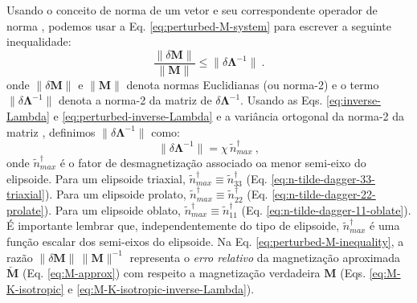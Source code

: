 Usando o conceito de norma de um vetor e seu correspondente operador de norma \citep{demmel1997, golub2013}, podemos usar a Eq.
\ref{eq:perturbed-M-system} para escrever a seguinte inequalidade:
\begin{equation}
\frac{\| \delta \mathbf{M} \|}{\| \mathbf{M} \|} \leq
\| \delta \mathbf{\Lambda}^{-1} \| \: .
\label{eq:perturbed-M-inequality}
\end{equation}
onde $\| \delta \mathbf{M} \|$ e $\| \mathbf{M} \|$
denota normas Euclidianas (ou norma-2) e o termo 
$\| \delta \mathbf{\Lambda}^{-1} \|$ denota a norma-2 da matriz
de $\delta \mathbf{\Lambda}^{-1}$.
Usando as Eqs. \ref{eq:inverse-Lambda} e \ref{eq:perturbed-inverse-Lambda}
e a variância ortogonal da norma-2 da matriz
\citep{demmel1997, golub2013}, definimos
$\| \delta \mathbf{\Lambda}^{-1} \|$ como:
\begin{equation}
\| \delta \mathbf{\Lambda}^{-1} \| = \chi \,
\tilde{n}^{\dagger}_{max} \: ,
\label{eq:norm-perturbed-inverse-Lambda}
\end{equation}
onde $\tilde{n}^{\dagger}_{max}$ é o fator de desmagnetização
associado oa menor semi-eixo do elipsoide.
Para um elipsoide triaxial, 
$\tilde{n}^{\dagger}_{max} \equiv \tilde{n}^{\dagger}_{33}$
(Eq. \ref{eq:n-tilde-dagger-33-triaxial}). Para um elipsoide prolato,
$\tilde{n}^{\dagger}_{max} \equiv \tilde{n}^{\dagger}_{22}$
(Eq. \ref{eq:n-tilde-dagger-22-prolate}). 
Para um elipsoide oblato,
$\tilde{n}^{\dagger}_{max} \equiv \tilde{n}^{\dagger}_{11}$
(Eq. \ref{eq:n-tilde-dagger-11-oblate}).
É importante lembrar que, independentemente do tipo de elipsoide, $\tilde{n}^{\dagger}_{max}$ é
uma função escalar dos semi-eixos do elipsoide.
Na Eq. \ref{eq:perturbed-M-inequality}, a razão
$\| \delta \mathbf{M} \| \, \| \mathbf{M} \|^{-1}$ representa o
\textit{erro relativo} da magnetização aproximada
$\breve{\mathbf{M}}$ (Eq. \ref{eq:M-approx}) com respeito a magnetização verdadeira
$\mathbf{M}$ (Eqs. \ref{eq:M-K-isotropic}
e \ref{eq:M-K-isotropic-inverse-Lambda}).

